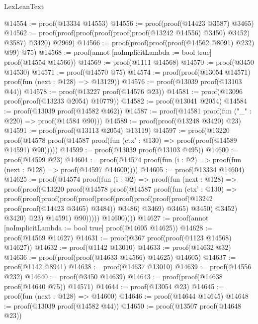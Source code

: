 \begin{lexlean}{LexLeanText}
\begin{coremodule}
@14554 := proof(@13334 @14553)
@14556 := proof(proof(@14423 @3587) @3465)
@14562 := proof(proof(proof(proof(proof(proof(@13242 @14556) @3450) @3452) @3587) @3420) @2969)
@14566 := proof(proof(proof(proof(@14562 @8091) @232) @99) @75)
@14568 := proof(annot [noImplicitLambda := bool true] proof(@14554 @14566))
@14569 := proof(@1111 @14568)
@14570 := proof(@3450 @14530)
@14571 := proof(@14570 @75)
@14574 := proof(proof(@13054 @14571) proof(fun (next : @128) => @13129))
@14576 := proof(@13039 proof(@13103 @44))
@14578 := proof(@13227 proof(@14576 @23))
@14581 := proof(@13096 proof(proof(@13233 @2054) @10779))
@14582 := proof(@13041 @2054)
@14584 := proof(@13039 proof(@14582 @462))
@14587 := proof(@14581 proof(fun ("_" : @220) => proof(@14584 @90)))
@14589 := proof(proof(@13248 @3420) @23)
@14591 := proof(proof(@13113 @2054) @13119)
@14597 := proof(@13220
      proof(@14578 proof(@14587 proof(fun (ctx' : @130) => proof(proof(@14589 @14591) @90)))))
@14599 := proof(@13039 proof(@13103 @495))
@14600 := proof(@14599 @23)
@14604 := proof(@14574 proof(fun (i : @2) => proof(fun (next : @128) => proof(@14597 @14600))))
@14605 := proof(@13334 @14604)
@14625 := proof(@14574
      proof(fun (i : @2) =>
        proof(fun (next : @128) =>
          proof(proof(@13220
                proof(@14578
                    proof(@14587
                        proof(fun (ctx' : @130) =>
                          proof(proof(proof(proof(proof(proof(proof(proof(proof(proof(@13242
                                                proof(proof(@14423 @3465) @3484))
                                              @3486)
                                            @3469)
                                          @3465)
                                        @3450)
                                      @3452)
                                    @3420)
                                  @23)
                                @14591)
                              @90)))))
              @14600))))
@14627 := proof(annot [noImplicitLambda := bool true] proof(@14605 @14625))
@14628 := proof(@14569 @14627)
@14631 := proof(@367 proof(proof(@1123 @14568) @14627))
@14632 := proof(@1142 @13010)
@14633 := proof(@14632 @32)
@14636 := proof(proof(proof(@14633 @14566) @14625) @14605)
@14637 := proof(@1142 @8941)
@14638 := proof(@14637 @13010)
@14639 := proof(@14556 @232)
@14640 := proof(@3450 @14639)
@14643 := proof(proof(@14638 proof(@14640 @75)) @14571)
@14644 := proof(@13054 @23)
@14645 := proof(fun (next : @128) => @14600)
@14646 := proof(@14644 @14645)
@14648 := proof(@13039 proof(@14582 @44))
@14650 := proof(@13507 proof(@14648 @23))

\end{coremodule}
\end{lexlean}

